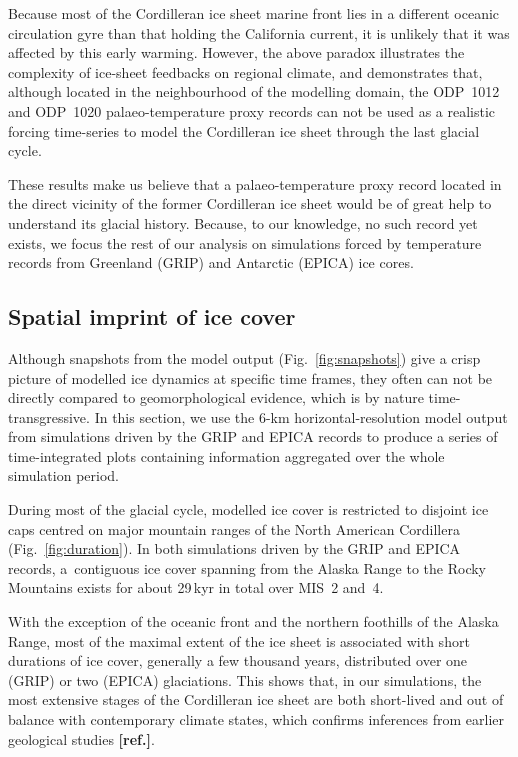 \documentclass[tc, manuscript]{copernicus}
\newcommand{\aref}[0]{\textbf{[ref.]}}
\begin{document}
Because most of the Cordilleran ice sheet marine front lies in a different
oceanic circulation gyre than that holding the California current, it is
unlikely that it was affected by this early warming. However, the above paradox
illustrates the complexity of ice-sheet feedbacks on regional climate, and
demonstrates that, although located in the neighbourhood of the modelling
domain, the ODP~1012 and ODP~1020 palaeo-temperature proxy records can not be
used as a realistic forcing time-series to model the Cordilleran ice sheet
through the last glacial cycle.

These results make us believe that a palaeo-temperature proxy record located
in the direct vicinity of the former Cordilleran ice sheet would be of great
help to understand its glacial history. Because, to our knowledge, no such
record yet exists, we focus the rest of our analysis on simulations forced by
temperature records from Greenland (GRIP) and Antarctic (EPICA) ice cores.

\subsection{Spatial imprint of ice cover}

Although snapshots from the model output (Fig.~\ref{fig:snapshots}) give a
crisp picture of modelled ice dynamics at specific time frames, they often
can not be directly compared to geomorphological evidence, which is by nature
time-transgressive. In this section, we use the 6-km horizontal-resolution
model output from simulations driven by the GRIP and EPICA records to produce
a series of time-integrated plots containing information aggregated over the
whole simulation period.

During most of the glacial cycle, modelled ice cover is restricted to disjoint
ice caps centred on major mountain ranges of the North American Cordillera
(Fig.~\ref{fig:duration}). In both simulations driven by the GRIP and EPICA
records, a~contiguous ice cover spanning from the Alaska Range to the Rocky
Mountains exists for about 29\,kyr in total over MIS~2 and~4.

With the exception of the oceanic front and the northern foothills of the Alaska
Range, most of the maximal extent of the ice sheet is associated with short
durations of ice cover, generally a few thousand years, distributed over one
(GRIP) or two (EPICA) glaciations. This shows that, in our simulations, the
most extensive stages of the Cordilleran ice sheet are both short-lived and
out of balance with contemporary climate states, which confirms
inferences from earlier geological studies \aref.
\end{document}
